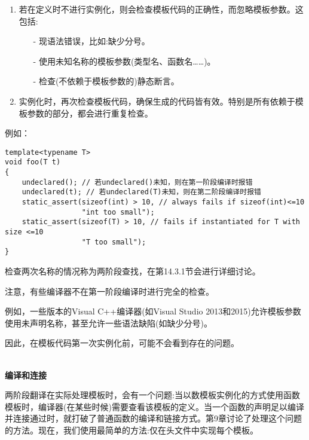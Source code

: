 \begin{enumerate}
\item 
若在定义时不进行实例化，则会检查模板代码的正确性，而忽略模板参数。这包括:
\begin{itemize}
\item[-] 
现语法错误，比如:缺少分号。

\item[-]
使用未知名称的模板参数(类型名、函数名……)。

\item[-]
检查(不依赖于模板参数的)静态断言。
\end{itemize}

\item 
实例化时，再次检查模板代码，确保生成的代码皆有效。特别是所有依赖于模板参数的部分，都会进行重复检查。
\end{enumerate}

例如：

\begin{lstlisting}[style=styleCXX]
template<typename T>
void foo(T t)
{
	undeclared(); // 若undeclared()未知，则在第一阶段编译时报错
	undeclared(t); // 若undeclared(T)未知，则在第二阶段编译时报错
	static_assert(sizeof(int) > 10, // always fails if sizeof(int)<=10
				  "int too small");
	static_assert(sizeof(T) > 10, // fails if instantiated for T with size <=10
	              "T too small");
}
\end{lstlisting}

检查两次名称的情况称为两阶段查找，在第14.3.1节会进行详细讨论。

注意，有些编译器不在第一阶段编译时进行完全的检查。

\begin{tcolorbox}[colback=webgreen!5!white,colframe=webgreen!75!black]
\hspace*{0.75cm}例如，一些版本的Visual C++编译器(如Visual Studio 2013和2015)允许模板参数使用未声明名称，甚至允许一些语法缺陷(如缺少分号)。
\end{tcolorbox}

因此，在模板代码第一次实例化前，可能不会看到存在的问题。

\hspace*{\fill} \\ %
\noindent
\textbf{编译和连接}

两阶段翻译在实际处理模板时，会有一个问题:当以数模板实例化的方式使用函数模板时，编译器(在某些时候)需要查看该模板的定义。当一个函数的声明足以编译并连接通过时，就打破了普通函数的编译和链接方式。第9章讨论了处理这个问题的方法。现在，我们使用最简单的方法:仅在头文件中实现每个模板。








